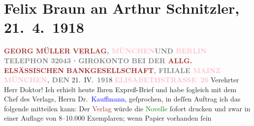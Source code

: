 

               \section[Felix Braun an Arthur Schnitzler, 21. 4. 1918]{ Felix Braun an Arthur Schnitzler, 21. 4. 1918}\nopagebreak{}\rehead{ }\normalsize\beginnumbering{} \toendnotes[C]{\smallbreak\pagebreak[2]} 
\toendnotes[C]{\smallbreak}\pstart
           \noindent{}\centering{}{\pb}\textcolor{gray}{\textbf{\textcolor{brown}{GEORG MÜLLER VERLAG}{}\ledrightnote{\textcolor{brown}{Georg Müller}}, \textcolor{pink}{MÜNCHEN}{}\ledrightnote{\textcolor{pink}{München}}{ }UND{ }\textcolor{pink}{BERLIN}{}\ledrightnote{\textcolor{pink}{Berlin}}}}\pend
           \pstart
           \noindent{}\textcolor{gray}{\textbf{TELEPHON 32043 ⋅ GIROKONTO BEI DER \textcolor{brown}{ALLG. ELSÄSSISCHEN BANKGESELLSCHAFT}{}\ledrightnote{\textcolor{brown}{Allgemeine elsässische Bankgesellschaft}}, FILIALE \textcolor{pink}{MAINZ}{}\ledrightnote{\textcolor{pink}{Mainz}}}}\pend
           \pstart
           \raggedleft{}\textcolor{gray}{\textbf{\textcolor{pink}{MÜNCHEN}{}\ledrightnote{\textcolor{pink}{München}}, DEN}}{ }21. IV. \textcolor{gray}{\textbf{191}}8\pend
           \pstart
           \raggedleft{}\textcolor{gray}{\textbf{\textcolor{pink}{ELISABETHSTRASSE 26}{}\ledrightnote{\textcolor{pink}{Elisabethstraße}}}}\pend
           \pstart{}Verehrter Herr Doktor!\pend\pstart
           Ich erhielt heute Ihren Expreß-Brief und habe ſogleich mit dem Chef des Verlags,
                    Herrn Dr. \textcolor{blue}{Kauffmann}{}\ledrightnote{\textcolor{blue}{Arthur I. Kauffmann}}, geſprochen, in deſſen
                    Auftrag ich das folgende mitteilen kann:\pend
           \pstart
           Der \textcolor{brown}{Verlag}{} würde die \textcolor{green}{Novelle}{} ſofort drucken und
                    zwar in einer Auflage von 8–10.000 Exemplaren; wenn Papier vorhanden ſein

